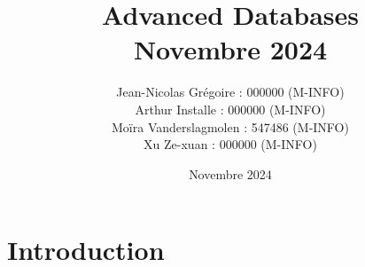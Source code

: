 \documentclass[journal, a4paper]{IEEEtran}
\begin{document}
\title{Advanced Databases \\\vspace*{20pt} \normalsize Novembre 2024}
\author{Jean-Nicolas Grégoire : 000000 (M-INFO) \\
        Arthur Installe : 000000 (M-INFO) \\
        Moïra Vanderslagmolen : 547486 (M-INFO) \\
        Xu Ze-xuan : 000000 (M-INFO)
        }
\date{Novembre 2024}
\maketitle


\section{Introduction}
\end{document}

